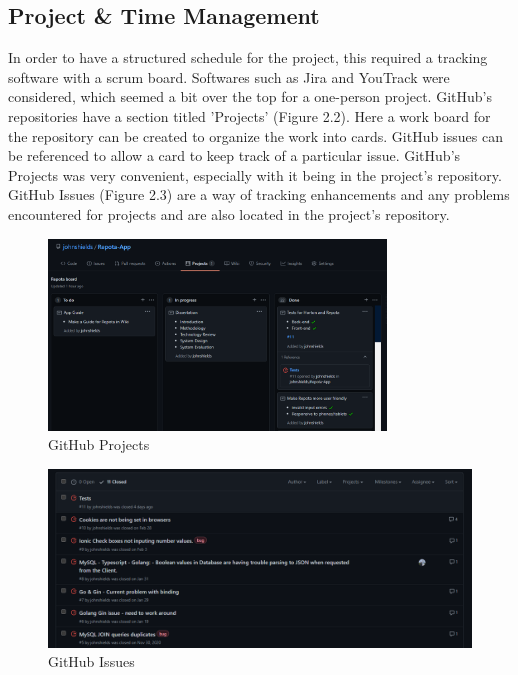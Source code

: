 \subsection{Project \& Time Management}
In order to have a structured schedule for the project, this required a tracking software with a scrum board. Softwares such as Jira and YouTrack were considered, which seemed a bit over the top for a one-person project. GitHub's repositories have a section titled 'Projects' (Figure 2.2). Here a work board for the repository can be created to organize the work into cards. GitHub issues can be referenced to allow a card to keep track of a particular issue. GitHub's Projects was very convenient, especially with it being in the project's repository. GitHub Issues (Figure 2.3) are a way of tracking enhancements and any problems encountered for projects and are also located in the project's repository.

\begin{figure}[!ht]
    \caption{GitHub Projects}
    \label{image:gitProjects}
    \centering
    \includegraphics[width=0.8\textwidth]{images/misc/git-projects.png}
\end{figure}

\begin{figure}[!ht]
    \caption{GitHub Issues}
    \label{image:gitIssues}
    \centering
    \includegraphics[width=0.8
    \textwidth]{images/misc/git-issues.png}
\end{figure}

